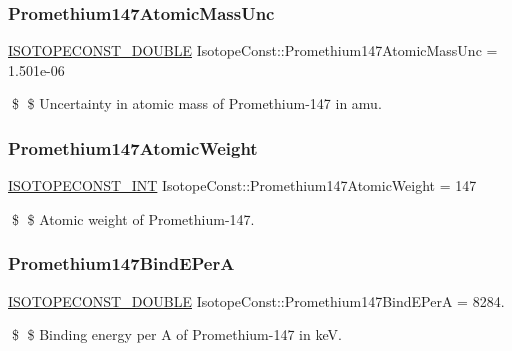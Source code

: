 \subsubsection{\texorpdfstring{Promethium147\+Atomic\+Mass\+Unc}{Promethium147AtomicMassUnc}}
{\footnotesize\ttfamily \mbox{\hyperlink{group___isotope_const-_macros_ga8f45a7272ce02c0b4c65c44636ed719a}{I\+S\+O\+T\+O\+P\+E\+C\+O\+N\+S\+T\+\_\+\+D\+O\+U\+B\+LE}} Isotope\+Const\+::\+Promethium147\+Atomic\+Mass\+Unc = 1.\+501e-\/06}

\$ \$ Uncertainty in atomic mass of Promethium-\/147 in amu. \mbox{\label{group___isotope_const-_promethium-_pm147_ga0626b3388b7e7685f3935584fd73dec8}} 
\subsubsection{\texorpdfstring{Promethium147\+Atomic\+Weight}{Promethium147AtomicWeight}}
{\footnotesize\ttfamily \mbox{\hyperlink{group___isotope_const-_macros_ga5f18360b3e99483a35c32d789e62621c}{I\+S\+O\+T\+O\+P\+E\+C\+O\+N\+S\+T\+\_\+\+I\+NT}} Isotope\+Const\+::\+Promethium147\+Atomic\+Weight = 147}

\$ \$ Atomic weight of Promethium-\/147. \mbox{\label{group___isotope_const-_promethium-_pm147_ga5ec0cb77345456471e1ad53617a5b2e5}} 
\subsubsection{\texorpdfstring{Promethium147\+Bind\+E\+PerA}{Promethium147BindEPerA}}
{\footnotesize\ttfamily \mbox{\hyperlink{group___isotope_const-_macros_ga8f45a7272ce02c0b4c65c44636ed719a}{I\+S\+O\+T\+O\+P\+E\+C\+O\+N\+S\+T\+\_\+\+D\+O\+U\+B\+LE}} Isotope\+Const\+::\+Promethium147\+Bind\+E\+PerA = 8284.}

\$ \$ Binding energy per A of Promethium-\/147 in keV. \mbox{\label{group___isotope_const-_promethium-_pm147_gae2b5a4d2469e50b5bfe91a53ff00a944}} 
